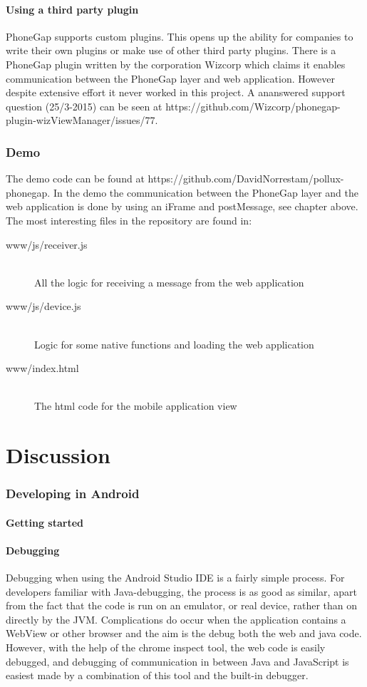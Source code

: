 \documentclass{./tex/cslthse-msc}
\begin{document}
\subsubsection{Using a third party plugin}
PhoneGap supports custom plugins. This opens up the ability for companies to write their own plugins or make use of other third party plugins.
\newline\newline
There is a PhoneGap plugin written by the corporation Wizcorp which claims it enables communication between the PhoneGap layer and web application. However despite extensive effort it never worked in this project. A ananswered support question (25/3-2015) can be seen at https://github.com/Wizcorp/phonegap-plugin-wizViewManager/issues/77. 

\subsection{Demo}
The demo code can be found at https://github.com/DavidNorrestam/pollux-phonegap. In the demo the communication between the PhoneGap layer and the web application is done by using an iFrame and postMessage, see chapter above. The most interesting files in the repository are found in:

\begin{description}
  \item[www/js/receiver.js] \hfill \\
    All the logic for receiving a message from the web application
  \item[www/js/device.js] \hfill \\
    Logic for some native functions and loading the web application
  \item[www/index.html] \hfill \\
    The html code for the mobile application view
\end{description}

\chapter{Discussion}
\subsection{Developing in Android}
\subsubsection{Getting started}
\subsubsection{Debugging}
Debugging when using the Android Studio IDE is a fairly simple process. For developers familiar with Java-debugging, the process is as good as similar, apart from the fact that the code is run on an emulator, or real device, rather than on directly by the JVM. Complications do occur when the application contains a WebView or other browser and the aim is the debug both the web and java code. However, with the help of the chrome inspect tool, the web code is easily debugged, and debugging of communication in between Java and JavaScript is easiest made by a combination of this tool and the built-in debugger. 
\end{document}
